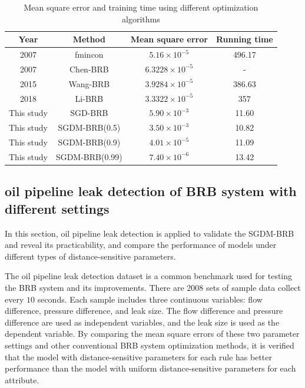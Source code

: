 \documentclass{ieeeaccess}
\begin{document}
\begin{table}
    \caption{Mean square error and training time using different optimization algorithms}
    \centering
    \label{tab3}
    \begin{tabular}{cccc}
        \hline
        Year       & Method             & Mean square error     & Running time \\
        \hline
        2007       & fmincon\cite{a10}  & $5.16\times10^{-5}$   & 496.17       \\
        2007       & Chen-BRB\cite{a13} & $6.3228\times10^{-5}$ & -            \\
        2015       & Wang-BRB\cite{a15} & $3.9284\times10^{-5}$ & 386.63       \\
        2018       & Li-BRB\cite{a36}   & $3.3322\times10^{-5}$ & 357          \\
        This study & SGD-BRB            & $5.90\times10^{-3}$   & 11.60        \\
        This study & SGDM-BRB(0.5)      & $3.50\times10^{-3}$   & 10.82        \\
        This study & SGDM-BRB(0.9)      & $4.01\times10^{-5}$   & 11.09        \\
        This study & SGDM-BRB(0.99)     & $7.40\times10^{-6}$   & 13.42        \\
        \hline
    \end{tabular}
\end{table}

\subsection{oil pipeline leak detection of BRB system with different settings}
In this section, oil pipeline leak detection is applied to validate the SGDM-BRB and reveal its practicability,
and compare the performance of models under different types of distance-sensitive parameters.

The oil pipeline leak detection dataset is a common benchmark used for testing the BRB system and its improvements.
There are $2008$ sets of sample data collect every $10$ seconds. Each sample includes three continuous variables: flow difference, pressure difference, and leak size.
The flow difference and pressure difference are used as independent variables, and the leak size is used as the dependent variable.
By comparing the mean square errors of these two parameter settings and other conventional BRB system optimization methods,
it is verified that the model with distance-sensitive parameters for each rule has better performance than the model with uniform distance-sensitive parameters for each attribute.
\end{document}
